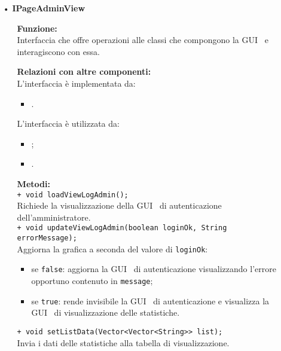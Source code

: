 {\begin{sloppypar}
{\begin{itemize}
		\item[•] \textbf{IPageAdminView}
			\begin{itemize}
				\item[]  \textbf{Funzione:} \\
				Interfaccia che offre operazioni alle classi che compongono la GUI\g~ e interagiscono con essa.
				
				\item[]  \textbf{Relazioni con altre componenti:} \\
				L'interfaccia è implementata da:
				\begin{itemize}
					\item {}.
				\end{itemize}
				L’interfaccia è utilizzata da:
				\begin{itemize}
					\item {};
					\item {}.
				\end{itemize}
				
				\item[]  \textbf{Metodi:}\\
					\texttt{+ void loadViewLogAdmin();}\\
					Richiede la visualizzazione della GUI\g~ di autenticazione dell’amministratore.\\
					
					\texttt{+ void updateViewLogAdmin(boolean loginOk, String errorMessage);}\\
					Aggiorna la grafica a seconda del valore di \texttt{loginOk}:
					\begin{itemize}
						\item se \texttt{false}: aggiorna la GUI\g~ di autenticazione visualizzando l’errore opportuno contenuto in \texttt{message};
						\item se \texttt{true}: rende invisibile la GUI\g~ di autenticazione e visualizza la GUI\g~ di visualizzazione delle statistiche.\\
					\end{itemize}
					
					\texttt{+ void setListData(Vector<Vector<String>> list);}\\
					Invia i dati delle statistiche alla tabella di visualizzazione.\\
					

\end{itemize}
\end{itemize}}
\end{sloppypar}}
